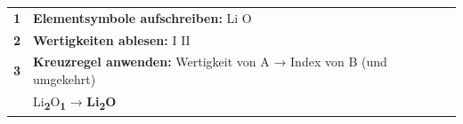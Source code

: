 \documentclass[10pt, a4paper]{article}
\newcommand{\lsg}[1]{\textcolor{loesung}{\textbf{#1}}}
\begin{document}
\begin{algorithmusbox}
\small
\begin{tabular}{@{}c p{12.5cm}@{}}
\textbf{1} & \textbf{Elementsymbole aufschreiben:} \hfill Li \quad O \\[0.4em]
\textbf{2} & \textbf{Wertigkeiten ablesen:} \hfill I \quad II \\[0.4em]
\textbf{3} & \textbf{Kreuzregel anwenden:} Wertigkeit von A → Index von B (und umgekehrt)\\
& \hfill Li\textsubscript{\lsg{2}}O\textsubscript{\lsg{1}} → \textbf{Li\textsubscript{2}O} \\
\end{tabular}
\end{algorithmusbox}

\vspace{-2pt}

\end{document}

